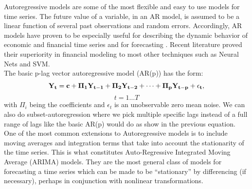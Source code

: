 Autoregressive models are some of the most flexible and easy to use models for time series. The future value of a variable, in an AR model, is assumed to be a linear function of several past observations and random errors. Accordingly, AR models have proven to be especially useful for describing the dynamic behavior of economic and financial time series and for forecasting \cite{tsay, VAR}. Recent literature proved their superiority in financial modeling to most other techniques such as Neural Nets and SVM. \cite{comparison} \\
The basic p-lag vector autoregressive model (AR(p)) has the form: $$\bf{Y}_t=\bf{c}+\bf{\Pi}_1\bf{Y}_{t-1}+\bf{\Pi}_2\bf{Y}_{t-2}+\cdots+\bf{\Pi}_p\bf{Y}_{t-p}+\epsilon_t,$$ $$t=1\ldots T$$ with $\Pi_i$ being the coefficients and $\epsilon_t$ is an unobservable zero mean noise. We can also do subset-autoregression where we pick multiple specific lags instead of a full range of lags like the basic AR(p) would do as show in the previous equation.\\
One of the most common extensions to Autoregressive models is to include moving averages and integration terms that take into account the stationarity of the time series. This is what constitutes Auto-Regressive Integrated Moving Average (ARIMA) models. They are  the most general class of models for forecasting a time series which can be made to be “stationary” by differencing (if necessary), perhaps in conjunction with nonlinear transformations.\\

